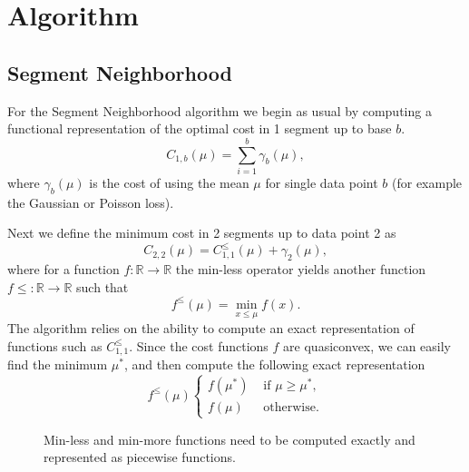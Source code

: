\documentclass{article}
\newcommand{\RR}{\mathbb R}
\begin{document}
\section{Algorithm}

\subsection{Segment Neighborhood}

For the Segment Neighborhood algorithm we begin as usual by computing
a functional representation of the optimal cost in 1 segment up to
base $b$. 
\begin{equation*}
  \label{eq:C1b}
  C_{1,b}(\mu) = \sum_{i=1}^b \gamma_b(\mu),
\end{equation*}
where $\gamma_b(\mu)$ is the cost of using the mean $\mu$ for single
data point $b$ (for example the Gaussian or Poisson loss).

Next we define the minimum cost in 2 segments up to data point 2 as
\begin{equation*}
  \label{eq:C22}
  C_{2,2}(\mu) = C_{1,1}^{\leq}(\mu) + \gamma_2(\mu),
\end{equation*}
where for a function $f:\RR\rightarrow\RR$ the min-less operator
yields another function $f\leq:\RR\rightarrow\RR$ such that
\begin{equation}
  \label{eq:min-less}
  f^{\leq}(\mu) = \min_{x\leq \mu} f(x).
\end{equation}
The algorithm relies on the ability to compute an exact representation
of functions such as $C_{1,1}^{\leq}$. Since the cost functions $f$
are quasiconvex, we can easily find the minimum $\mu^*$, and then
compute the following exact representation
\begin{equation*}
  f^\leq(\mu)
  \begin{cases}
    f(\mu^*) & \text{ if } \mu \geq \mu^*,\\
    f(\mu) & \text{ otherwise.}
  \end{cases}
\end{equation*}

\begin{figure}[!t]
  \parbox{3in}{
    \begin{center}
    
    \end{center}
  }
  \parbox{3in}{
    \begin{center}
      
    \end{center}
  }
  \caption{\label{fig:min-operators} Min-less and min-more
    functions need to be computed exactly and represented as piecewise
    functions.}
\end{figure}
\end{document}
